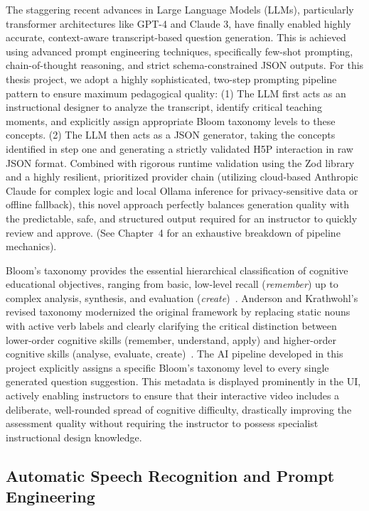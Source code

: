 The staggering recent advances in Large Language Models (LLMs), particularly transformer architectures like GPT-4 and Claude 3, have finally enabled highly accurate, context-aware transcript-based question generation. This is achieved using advanced prompt engineering techniques, specifically few-shot prompting, chain-of-thought reasoning, and strict schema-constrained JSON outputs. For this thesis project, we adopt a highly sophisticated, two-step prompting pipeline pattern to ensure maximum pedagogical quality: 
(1) The LLM first acts as an instructional designer to analyze the transcript, identify critical teaching moments, and explicitly assign appropriate Bloom taxonomy levels to these concepts.
(2) The LLM then acts as a JSON generator, taking the concepts identified in step one and generating a strictly validated H5P interaction in raw JSON format. 
Combined with rigorous runtime validation using the Zod library and a highly resilient, prioritized provider chain (utilizing cloud-based Anthropic Claude for complex logic and local Ollama inference for privacy-sensitive data or offline fallback), this novel approach perfectly balances generation quality with the predictable, safe, and structured output required for an instructor to quickly review and approve. (See Chapter~4 for an exhaustive breakdown of pipeline mechanics).

Bloom's taxonomy provides the essential hierarchical classification of cognitive educational objectives, ranging from basic, low-level recall (\emph{remember}) up to complex analysis, synthesis, and evaluation (\emph{create})~\cite{bloom1956}. Anderson and Krathwohl's revised taxonomy modernized the original framework by replacing static nouns with active verb labels and clearly clarifying the critical distinction between lower-order cognitive skills (remember, understand, apply) and higher-order cognitive skills (analyse, evaluate, create)~\cite{anderson2001}. The AI pipeline developed in this project explicitly assigns a specific Bloom's taxonomy level to every single generated question suggestion. This metadata is displayed prominently in the UI, actively enabling instructors to ensure that their interactive video includes a deliberate, well-rounded spread of cognitive difficulty, drastically improving the assessment quality without requiring the instructor to possess specialist instructional design knowledge.

\subsection{Automatic Speech Recognition and Prompt Engineering}

